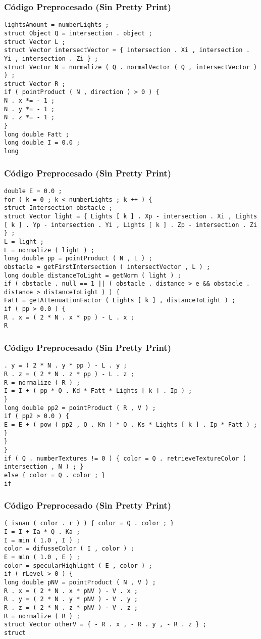 \documentclass{beamer}
\begin{document}
\begin{frame}[fragile]
\frametitle{C\'odigo Preprocesado (Sin Pretty Print)}
\begin{lstlisting}[style=CStyle]
lightsAmount = numberLights ; 
struct Object Q = intersection . object ; 
struct Vector L ; 
struct Vector intersectVector = { intersection . Xi , intersection . Yi , intersection . Zi } ; 
struct Vector N = normalize ( Q . normalVector ( Q , intersectVector ) ) ; 
struct Vector R ; 
if ( pointProduct ( N , direction ) > 0 ) { 
N . x *= - 1 ; 
N . y *= - 1 ; 
N . z *= - 1 ; 
} 
long double Fatt ; 
long double I = 0.0 ; 
long \end{lstlisting}
\end{frame}
\begin{frame}[fragile]
\frametitle{C\'odigo Preprocesado (Sin Pretty Print)}
\begin{lstlisting}[style=CStyle]
double E = 0.0 ; 
for ( k = 0 ; k < numberLights ; k ++ ) { 
struct Intersection obstacle ; 
struct Vector light = { Lights [ k ] . Xp - intersection . Xi , Lights [ k ] . Yp - intersection . Yi , Lights [ k ] . Zp - intersection . Zi } ; 
L = light ; 
L = normalize ( light ) ; 
long double pp = pointProduct ( N , L ) ; 
obstacle = getFirstIntersection ( intersectVector , L ) ; 
long double distanceToLight = getNorm ( light ) ; 
if ( obstacle . null == 1 || ( obstacle . distance > e && obstacle . distance > distanceToLight ) ) { 
Fatt = getAttenuationFactor ( Lights [ k ] , distanceToLight ) ; 
if ( pp > 0.0 ) { 
R . x = ( 2 * N . x * pp ) - L . x ; 
R \end{lstlisting}
\end{frame}
\begin{frame}[fragile]
\frametitle{C\'odigo Preprocesado (Sin Pretty Print)}
\begin{lstlisting}[style=CStyle]
. y = ( 2 * N . y * pp ) - L . y ; 
R . z = ( 2 * N . z * pp ) - L . z ; 
R = normalize ( R ) ; 
I = I + ( pp * Q . Kd * Fatt * Lights [ k ] . Ip ) ; 
} 
long double pp2 = pointProduct ( R , V ) ; 
if ( pp2 > 0.0 ) { 
E = E + ( pow ( pp2 , Q . Kn ) * Q . Ks * Lights [ k ] . Ip * Fatt ) ; 
} 
} 
} 
if ( Q . numberTextures != 0 ) { color = Q . retrieveTextureColor ( intersection , N ) ; } 
else { color = Q . color ; } 
if \end{lstlisting}
\end{frame}
\begin{frame}[fragile]
\frametitle{C\'odigo Preprocesado (Sin Pretty Print)}
\begin{lstlisting}[style=CStyle]
( isnan ( color . r ) ) { color = Q . color ; } 
I = I + Ia * Q . Ka ; 
I = min ( 1.0 , I ) ; 
color = difusseColor ( I , color ) ; 
E = min ( 1.0 , E ) ; 
color = specularHighlight ( E , color ) ; 
if ( rLevel > 0 ) { 
long double pNV = pointProduct ( N , V ) ; 
R . x = ( 2 * N . x * pNV ) - V . x ; 
R . y = ( 2 * N . y * pNV ) - V . y ; 
R . z = ( 2 * N . z * pNV ) - V . z ; 
R = normalize ( R ) ; 
struct Vector otherV = { - R . x , - R . y , - R . z } ; 
struct \end{lstlisting}
\end{frame}
\end{document}
